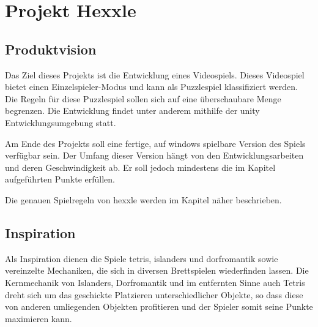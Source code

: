 \documentclass[../main.tex]{subfiles}
\begin{document}
	\section{Projekt Hexxle}
	\subsection{Produktvision}
	\label{section:Produktvision}
	\par Das Ziel dieses Projekts ist die Entwicklung eines Videospiels. Dieses Videospiel bietet einen Einzelspieler-Modus und kann als Puzzlespiel klassifiziert werden. Die Regeln für diese Puzzlespiel sollen sich auf eine überschaubare Menge begrenzen. Die Entwicklung findet unter anderem mithilfe der \gls{unity} Entwicklungsumgebung statt.
	\par Am Ende des Projekts soll eine fertige, auf \gls{windows} spielbare Version des Spiels verfügbar sein. Der Umfang dieser Version hängt von den Entwicklungsarbeiten und deren Geschwindigkeit ab. Er soll jedoch mindestens die im Kapitel  aufgeführten Punkte erfüllen.
	\par Die genauen Spielregeln von \gls{hexxle} werden im Kapitel  näher beschrieben.
	\subsection{Inspiration}
	\par Als Inspiration dienen die Spiele \gls{tetris}, \gls{islanders} und \gls{dorfromantik} sowie vereinzelte Mechaniken, die sich in diversen Brettspielen wiederfinden lassen. Die Kernmechanik von Islanders, Dorfromantik und im entfernten Sinne auch Tetris dreht sich um das geschickte Platzieren unterschiedlicher Objekte, so dass diese von anderen umliegenden Objekten profitieren und der Spieler somit seine Punkte maximieren kann.
\end{document}
